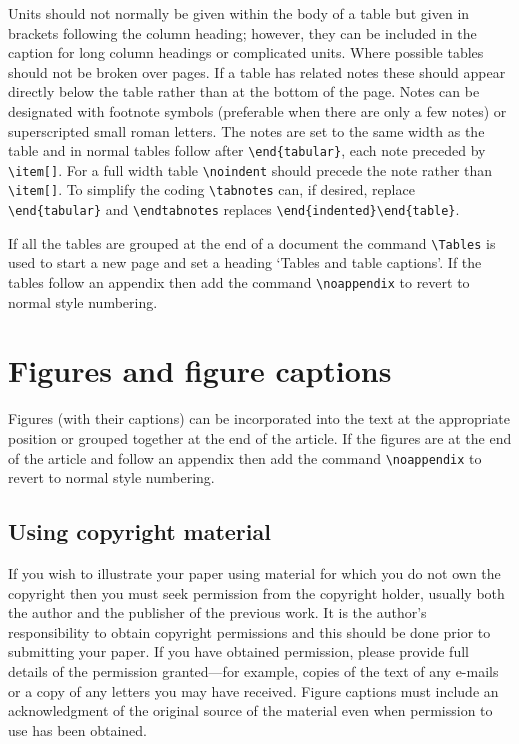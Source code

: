\documentclass[12pt]{iopart}
\begin{document}
Units should not normally be given within the body of a table but 
given in brackets following the column heading; however, they can be 
included in the caption for long column headings or complicated units. 
Where possible tables should not be broken over pages. 
If a table has related notes these should appear directly below the table
rather than at the bottom of the page. Notes can be designated with
footnote symbols (preferable when there are only a few notes) or
superscripted small roman letters. The notes are set to the same width as
the table and in normal tables follow after \verb"\end{tabular}", each
note preceded by \verb"\item[]". For a full width table \verb"\noindent"
should precede the note rather than \verb"\item[]". To simplify the coding 
\verb"\tabnotes" can, if desired, replace \verb"\end{tabular}" and 
\verb"\endtabnotes" replaces
\verb"\end{indented}\end{table}".

If all the tables are grouped at the end of a document
the command \verb"\Tables" is used to start a new page and 
set a heading `Tables and table captions'. If the tables follow an appendix then add the command \verb"\noappendix" to revert to normal style numbering.
  
\section{Figures and figure captions}

Figures (with their captions) can be incorporated into the text at the appropriate position or grouped together
at the end of the article. If the figures are at the end of the article and follow an appendix then add the command \verb"\noappendix" to revert to normal style numbering.

\subsection{Using copyright material}
If you wish to illustrate your paper using material for which you 
do not own the copyright then you must seek permission from 
the copyright holder, usually both the author and the publisher of the previous work. It is the author's responsibility to obtain 
copyright permissions and this should be done
prior to submitting your paper. 
If you have obtained permission, please provide full details of 
the permission granted---for example, copies of the text of any e-mails 
or a copy of any letters you may have received. Figure captions must include an acknowledgment of the original source of the material even when permission to use has been obtained.
\end{document}
